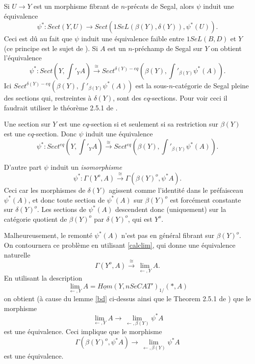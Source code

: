 \documentclass[12pt]{article}
\begin{document}
Si $U\rightarrow Y$ est un morphisme fibrant de $n$-pr\'ecats de Segal, alors
$\psi$ induit une \'equivalence
$$
\psi ^{\ast}: Sect (Y, U)\rightarrow Sect (1SeL(\beta (Y), \delta (Y)), \psi
^{\ast}(U)).
$$
Ceci est d\^u au fait que $\psi $ induit une \'equivalence faible entre
$1SeL(B,D)$
et $Y$ (ce principe est le sujet de \cite{DwyerKanDiags}).  Si $A$ est un
$n$-pr\'echamp de Segal sur $Y$ on obtient l'\'equivalence $$
\psi ^{\ast}: Sect (Y, \int '_YA)\stackrel{\cong}{\rightarrow}
Sect ^{\delta (Y)-eq}(\beta (Y), \int '_{\beta (Y)}\psi ^{\ast}(A)).
$$
Ici $Sect ^{\delta (Y)-eq}(\beta (Y), \int '_{\beta (Y)}\psi ^{\ast}(A))$
est la sous-$n$-cat\'egorie de Segal
pleine des sections qui, restreintes \`a $\delta (Y)$, sont des $eq$-sections.
Pour voir ceci il faudrait utiliser le th\'eor\`eme 2.5.1 de \cite{limits}.


Une section sur $Y$ est une $eq$-section si et seulement si sa restriction sur
$\beta (Y)$ est une $eq$-section. Donc $\psi$ induit une \'equivalence
$$
\psi ^{\ast}: Sect ^{eq}(Y, \int '_YA)\stackrel{\cong}{\rightarrow}
Sect ^{eq}(\beta (Y), \int '_{\beta (Y)}\psi ^{\ast}(A)).
$$

D'autre part $\psi$ induit un {\em isomorphisme}
$$
\psi ^{\ast}: \Gamma (Y^o,A) \stackrel{\cong}{\rightarrow}\Gamma (\beta (Y) ^o,
\psi ^{\ast}A).
$$
Ceci car les morphismes de $\delta (Y)$ agissent comme l'identit\'e dans le
pr\'efaisceau $\psi ^{\ast}(A)$, et donc toute section de
$\psi ^{\ast}(A)$ sur $\beta (Y)^o$ est forc\'ement constante sur $\delta
(Y)^o$.
Les sections de $\psi ^{\ast}(A)$ descendent donc (uniquement) sur la
cat\'egorie
quotient de $\beta (Y)^o$ par $\delta (Y)^o$, qui est $Y^o$.

Malheureusement, le remont\'e $\psi ^{\ast}(A)$ n'est pas en g\'en\'eral
fibrant
sur $\beta (Y)^o$. On contournera ce probl\`eme en utilisant \ref{calclim},
qui donne une \'equivalence naturelle
$$
\Gamma (Y^o, A)\stackrel{\cong}{\rightarrow}
\lim _{\leftarrow , Y} A.
$$
En utilisant la description
$$
\lim _{\leftarrow , Y} A= \underline{Hom}(Y, nSeCAT')_{1/}(\ast , A)
$$
on obtient (\`a cause du lemme \ref{bd} ci-dessus ainsi que le Theorem 2.5.1
de \cite{limits}) que le morphisme
$$
\lim _{\leftarrow , Y} A\rightarrow \lim _{\leftarrow , \beta (Y)} \psi ^{\ast}A
$$
est une \'equivalence. Ceci implique que le morphisme
$$
\Gamma (\beta (Y)^o, \psi ^{\ast} A) \rightarrow
\lim _{\leftarrow , \beta (Y)} \psi ^{\ast}A
$$
est une \'equivalence.
\end{document}
